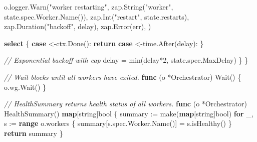 \documentclass[
]{article}
\newenvironment{Shaded}{}{}
\newcommand{\BuiltInTok}[1]{\textcolor[rgb]{0.00,0.50,0.00}{#1}}
\newcommand{\CommentTok}[1]{\textcolor[rgb]{0.38,0.63,0.69}{\textit{#1}}}
\newcommand{\ControlFlowTok}[1]{\textcolor[rgb]{0.00,0.44,0.13}{\textbf{#1}}}
\newcommand{\DataTypeTok}[1]{\textcolor[rgb]{0.56,0.13,0.00}{#1}}
\newcommand{\DecValTok}[1]{\textcolor[rgb]{0.25,0.63,0.44}{#1}}
\newcommand{\KeywordTok}[1]{\textcolor[rgb]{0.00,0.44,0.13}{\textbf{#1}}}
\newcommand{\NormalTok}[1]{#1}
\newcommand{\OperatorTok}[1]{\textcolor[rgb]{0.40,0.40,0.40}{#1}}
\newcommand{\StringTok}[1]{\textcolor[rgb]{0.25,0.44,0.63}{#1}}
\begin{document}
\begin{Shaded}
\begin{Highlighting}[]
\NormalTok{        o}\OperatorTok{.}\NormalTok{logger}\OperatorTok{.}\NormalTok{Warn}\OperatorTok{(}\StringTok{"worker restarting"}\OperatorTok{,}
\NormalTok{            zap}\OperatorTok{.}\NormalTok{String}\OperatorTok{(}\StringTok{"worker"}\OperatorTok{,}\NormalTok{ state}\OperatorTok{.}\NormalTok{spec}\OperatorTok{.}\NormalTok{Worker}\OperatorTok{.}\NormalTok{Name}\OperatorTok{()),}
\NormalTok{            zap}\OperatorTok{.}\NormalTok{Int}\OperatorTok{(}\StringTok{"restart"}\OperatorTok{,}\NormalTok{ state}\OperatorTok{.}\NormalTok{restarts}\OperatorTok{),}
\NormalTok{            zap}\OperatorTok{.}\NormalTok{Duration}\OperatorTok{(}\StringTok{"backoff"}\OperatorTok{,}\NormalTok{ delay}\OperatorTok{),}
\NormalTok{            zap}\OperatorTok{.}\NormalTok{Error}\OperatorTok{(}\NormalTok{err}\OperatorTok{),}
        \OperatorTok{)}

        \ControlFlowTok{select} \OperatorTok{\{}
        \ControlFlowTok{case} \OperatorTok{\textless{}{-}}\NormalTok{ctx}\OperatorTok{.}\NormalTok{Done}\OperatorTok{():}
            \ControlFlowTok{return}
        \ControlFlowTok{case} \OperatorTok{\textless{}{-}}\NormalTok{time}\OperatorTok{.}\NormalTok{After}\OperatorTok{(}\NormalTok{delay}\OperatorTok{):}
        \OperatorTok{\}}

        \CommentTok{// Exponential backoff with cap}
\NormalTok{        delay }\OperatorTok{=}\NormalTok{ min}\OperatorTok{(}\NormalTok{delay}\OperatorTok{*}\DecValTok{2}\OperatorTok{,}\NormalTok{ state}\OperatorTok{.}\NormalTok{spec}\OperatorTok{.}\NormalTok{MaxDelay}\OperatorTok{)}
    \OperatorTok{\}}
\OperatorTok{\}}

\CommentTok{// Wait blocks until all workers have exited.}
\KeywordTok{func} \OperatorTok{(}\NormalTok{o }\OperatorTok{*}\NormalTok{Orchestrator}\OperatorTok{)}\NormalTok{ Wait}\OperatorTok{()} \OperatorTok{\{}\NormalTok{ o}\OperatorTok{.}\NormalTok{wg}\OperatorTok{.}\NormalTok{Wait}\OperatorTok{()} \OperatorTok{\}}

\CommentTok{// HealthSummary returns health status of all workers.}
\KeywordTok{func} \OperatorTok{(}\NormalTok{o }\OperatorTok{*}\NormalTok{Orchestrator}\OperatorTok{)}\NormalTok{ HealthSummary}\OperatorTok{()} \KeywordTok{map}\OperatorTok{[}\DataTypeTok{string}\OperatorTok{]}\DataTypeTok{bool} \OperatorTok{\{}
\NormalTok{    summary }\OperatorTok{:=} \BuiltInTok{make}\OperatorTok{(}\KeywordTok{map}\OperatorTok{[}\DataTypeTok{string}\OperatorTok{]}\DataTypeTok{bool}\OperatorTok{)}
    \ControlFlowTok{for}\NormalTok{ \_}\OperatorTok{,}\NormalTok{ s }\OperatorTok{:=} \KeywordTok{range}\NormalTok{ o}\OperatorTok{.}\NormalTok{workers }\OperatorTok{\{}
\NormalTok{        summary}\OperatorTok{[}\NormalTok{s}\OperatorTok{.}\NormalTok{spec}\OperatorTok{.}\NormalTok{Worker}\OperatorTok{.}\NormalTok{Name}\OperatorTok{()]} \OperatorTok{=}\NormalTok{ s}\OperatorTok{.}\NormalTok{isHealthy}\OperatorTok{()}
    \OperatorTok{\}}
    \ControlFlowTok{return}\NormalTok{ summary}
\OperatorTok{\}}
\end{Highlighting}
\end{Shaded}
\end{document}
